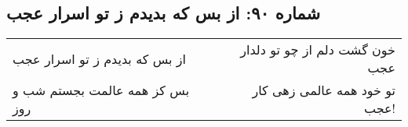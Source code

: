\begin{center}
\section*{شماره ۹۰: از بس که بدیدم ز تو اسرار عجب}
\label{sec:090}
\begin{longtable}{l p{0.5cm} r}
از بس که بدیدم ز تو اسرار عجب
&&
خون گشت دلم از چو تو دلدار عجب
\\
بس کز همه عالمت بجستم شب و روز
&&
تو خود همه عالمی زهی کار عجب!
\\
\end{longtable}
\end{center}
